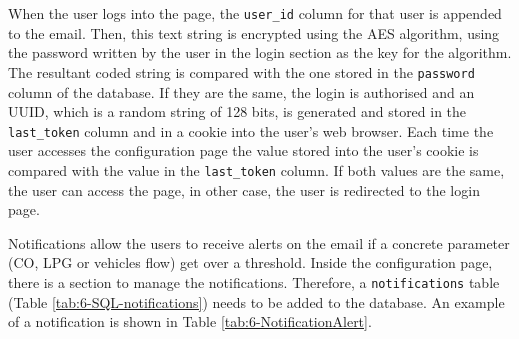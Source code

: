 When the user logs into the page, the \texttt{user\_id} column for that user is appended to the email. Then, this text string is encrypted using the \ac{AES} algorithm, using the password written by the user in the login section as the key for the algorithm. The resultant coded string is compared with the one stored in the \texttt{password} column of the database. If they are the same, the login is authorised and an \ac{UUID}, which is a random string of 128 bits, is generated and stored in the \texttt{last\_token} column and in a cookie into the user's web browser.
Each time the user accesses the configuration page the value stored into the user's cookie is compared with the value in the \texttt{last\_token} column. If both values are the same, the user can access the page, in other case, the user is redirected to the login page.

Notifications allow the users to receive alerts on the email if a concrete parameter (CO, LPG or vehicles flow) get over a threshold. Inside the configuration page, there is a section to manage the notifications. Therefore, a \texttt{notifications} table (Table \ref{tab:6-SQL-notifications}) needs to be added to the database. An example of a notification is shown in Table \ref{tab:6-NotificationAlert}.

